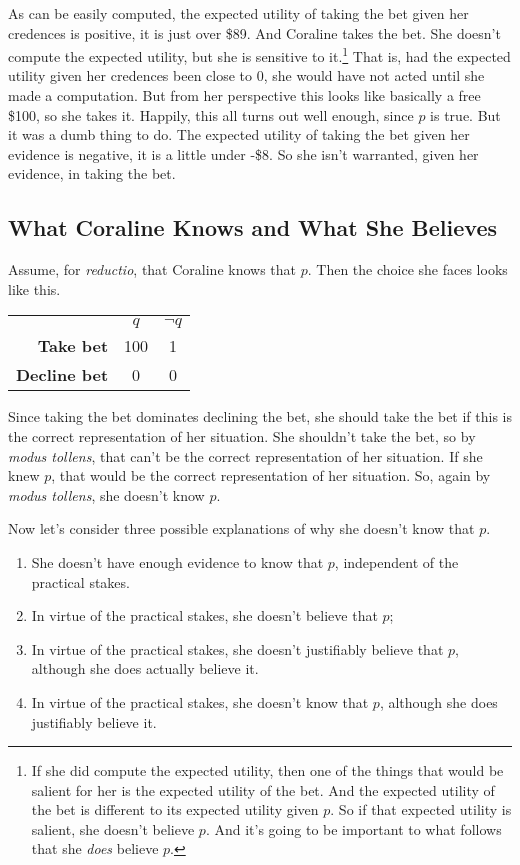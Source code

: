 \noindent As can be easily computed, the expected utility of taking the bet given her credences is positive, it is just over \$89. And Coraline takes the bet. She doesn't compute the expected utility, but she is sensitive to it.\footnote{If she did compute the expected utility, then one of the things that would be salient for her is the expected utility of the bet. And the expected utility of the bet is different to its expected utility given $p$. So if that expected utility is salient, she doesn't believe $p$. And it's going to be important to what follows that she \textit{does} believe $p$.} That is, had the expected utility given her credences been close to 0, she would have not acted until she made a computation. But from her perspective this looks like basically a free \$100, so she takes it. Happily, this all turns out well enough, since $p$ is true. But it was a dumb thing to do. The expected utility of taking the bet given her evidence is negative, it is a little under -\$8. So she isn't warranted, given her evidence, in taking the bet.



\subsection{What Coraline Knows and What She Believes}

Assume, for \textit{reductio}, that Coraline knows that $p$. Then the choice she faces looks like this.

\begin{center}
\begin{tabular}{r c c}
 & \textbf{$q$} & \textbf{$\neg q$}  \\
\textbf{Take bet} & 100 & 1 \\
\textbf{Decline bet} & 0 & 0 \\
\end{tabular}
\end{center}

\noindent Since taking the bet dominates declining the bet, she should take the bet if this is the correct representation of her situation. She shouldn't take the bet, so by \textit{modus tollens}, that can't be the correct representation of her situation. If she knew $p$, that would be the correct representation of her situation. So, again by \textit{modus tollens}, she doesn't know $p$.

Now let's consider three possible explanations of why she doesn't know that $p$.

\begin{enumerate}
\item She doesn't have enough evidence to know that $p$, independent of the practical stakes.
\item In virtue of the practical stakes, she doesn't believe that $p$;
\item In virtue of the practical stakes, she doesn't justifiably believe that $p$, although she does actually believe it.
\item In virtue of the practical stakes, she doesn't know that $p$, although she does justifiably believe it.
\end{enumerate}

